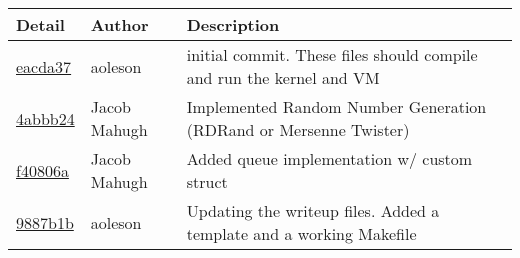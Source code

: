 \begin{tabular}{l l l}\textbf{Detail} & \textbf{Author} & \textbf{Description}\\\hline
\href{git@github.com:aoleson/cs444/commit/eacda375043af0c890654149a289a781c0d558cf}{eacda37} & aoleson & initial commit. These files should compile and run the kernel and VM\\\hline
\href{git@github.com:aoleson/cs444/commit/4abbb240a90bdba422c608f9917f45b501decaac}{4abbb24} & Jacob Mahugh & Implemented Random Number Generation (RDRand or Mersenne Twister)\\\hline
\href{git@github.com:aoleson/cs444/commit/f40806a12aac697608b0364de9c29d803cbb688f}{f40806a} & Jacob Mahugh & Added queue implementation w/ custom struct\\\hline
\href{git@github.com:aoleson/cs444/commit/9887b1bce65d52ad32789073e14cdbdf505287cb}{9887b1b} & aoleson & Updating the writeup files. Added a template and a working Makefile\\\hline\end{tabular}
